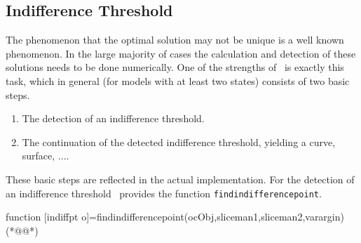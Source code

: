 \subsection{Indifference Threshold}
The phenomenon that the optimal solution may not be unique is a well known phenomenon. In the large majority of cases the calculation and detection of these solutions needs to be done numerically. One of the strengths of \OCMAT\ is exactly this task, which in general (for models with at least two states) consists of two basic steps.
\begin{enumerate}
	\item The detection of an indifference threshold.
	\item The continuation of the detected indifference threshold, yielding a curve, surface, ....
\end{enumerate}
These basic steps are reflected in the actual implementation. For the detection of an indifference threshold \OCMAT\ provides the function \lstinline+findindifferencepoint+.
\begin{matlab}
function [indiffpt o]=findindifferencepoint(ocObj,sliceman1,sliceman2,varargin)(*@@*)
%
%
%
%
%
%
%
\end{matlab}

